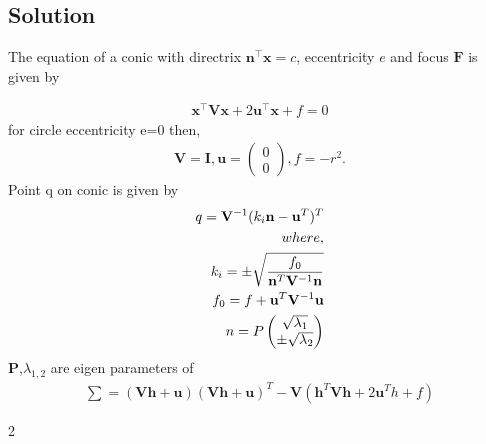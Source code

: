 \documentclass{article}
\newcommand{\myvec}[1]{\ensuremath{\begin{pmatrix}#1\end{pmatrix}}}
\let\vec\mathbf
\begin{document}
\begin{multicols}{2}
\section*{Solution}
\begin{flushleft}
The equation of  a conic with directrix $\vec{n}^{\top}\vec{x} = c$, eccentricity $e$ and focus $\vec{F}$ is given by 
\end{flushleft}
\begin{align}
    \vec{x}^{\top}\vec{V}\vec{x}+2\vec{u}^{\top}\vec{x}+f=0
\end{align}
\hspace{-2cm}for circle eccentricity e=0
then, 
\begin{align}
	\vec{V}
	=\vec{I},
\vec{u} = \myvec{0\\0},  f = -r^2.
	\label{eq:matrix-10-13-param}
\end{align}
\hspace{-2.5cm}Point q on conic is given by
\begin{align*}
q=\vec{V}^{-1}(k_i\vec{n}-\vec{u}^T)^T \\
\hspace{-6cm}where,\\
k_i=\pm \sqrt{\frac{f_0}{\vec{n}^T\vec{V}^{-1}\vec{n}}}\\
f_0=f+\vec{u}^T\vec{V}^{-1}\vec{u}\\
n=P\myvec{\sqrt{\lambda_1}\\\pm \sqrt{\lambda_2}}
\end{align*}
\hspace{-2cm}$\vec{P}$,$\lambda_{1,2}$ are eigen parameters of 
\begin{align*}
\sum=(\vec{V}\vec{h}+\vec{u})(\vec{V}\vec{h}+\vec{u})^T-\vec{V}(\vec{h}^T\vec{V}\vec{h}+2\vec{u}^Th+f)
\end{align*}
\end{multicols}{2}
\end{document}
